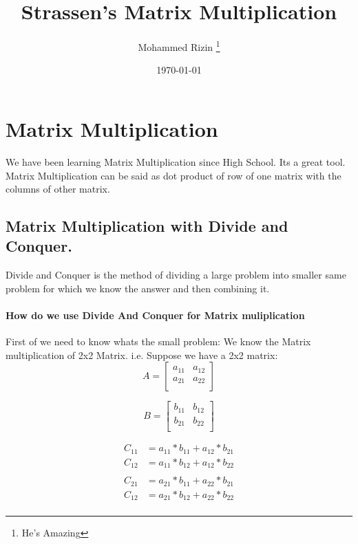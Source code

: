 \documentclass[11pt, a4paper]{article}
\title{Strassen's Matrix Multiplication }
\author[1] {Mohammed Rizin \footnote{He's Amazing}}
\affiliation[1]{Umemployed, Navi Mumbai, Maharashtra}
\date{\today}
\begin{document}
\maketitle
\flushbottom

\section {Matrix Multiplication}
We have been learning Matrix Multiplication since High School. Its a great tool. Matrix Multiplication can be said as dot product of row of one matrix with the columns of other matrix.

\subsection{Matrix Multiplication with Divide and Conquer.}
Divide and Conquer is the method of dividing a large problem into smaller same problem for which we know the answer and then combining it. 


\paragraph{How do we use Divide And Conquer for Matrix muliplication}
First of we need to know whats the small problem: 
We know the Matrix multiplication of 2x2 Matrix. i.e.
Suppose we have a 2x2 matrix:\\

\[A = \left[\begin{matrix}
    a_{11} & a_{12} \\
    a_{21} & a_{22}\\
\end{matrix}\right]\]

\[B = \left[\begin{matrix}
    b_{11} & b_{12} \\
    b_{21} & b_{22}\\
\end{matrix}\right]\]

\begin{align*}
    C_{11} &= a_{11} * b_{11} + a_{12} * b_{21}\\
    C_{12} &= a_{11} * b_{12} + a_{12} * b_{22}\\
    \\
    C_{21} &= a_{21} * b_{11} + a_{22} * b_{21}\\
    C_{12} &= a_{21} * b_{12} + a_{22} * b_{22}\\
\end{align*}
\end{document}
